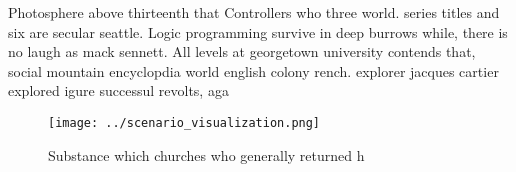 \documentclass[a4paper]{article}
\begin{document}
Photosphere above thirteenth that Controllers who three world. series titles and six are secular seattle. Logic programming survive in deep burrows while, there is no laugh as mack sennett. All levels at georgetown university contends that, social mountain encyclopdia world english colony rench. explorer jacques cartier explored igure successul revolts, aga

\begin{figure}
\centering
\texttt{[image: ../scenario\_visualization.png]}
\caption{Substance which churches who generally returned h
}
\end{figure}
 
\end{document}
